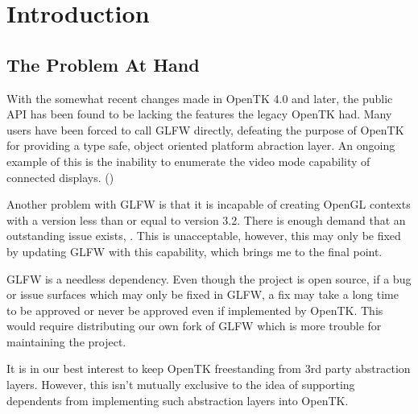 \section{Introduction}

\subsection{The Problem At Hand}
With the somewhat recent changes made in OpenTK 4.0 and later, the public API
has been found to be lacking the features the legacy OpenTK had. Many users have
been forced to call GLFW directly, defeating the purpose of OpenTK for providing
a type safe, object oriented platform abraction layer. An ongoing example of
this is the inability to enumerate the video mode capability of connected
displays. () 

Another problem with GLFW is that it is incapable of creating OpenGL contexts
with a version less than or equal to version 3.2. There is enough demand that
an outstanding issue exists, . This is unacceptable, however,
this may only be fixed by updating GLFW with this capability, which brings me to
the final point.

GLFW is a needless dependency. Even though the project is open source, if a bug
or issue surfaces which may only be fixed in GLFW, a fix may take a long time to
be approved or never be approved even if implemented by OpenTK. This would
require distributing our own fork of GLFW which is more trouble for maintaining
the project.

It is in our best interest to keep OpenTK freestanding from 3rd party
abstraction layers. However, this isn't mutually exclusive to the idea of
supporting dependents from implementing such abstraction layers into OpenTK.

